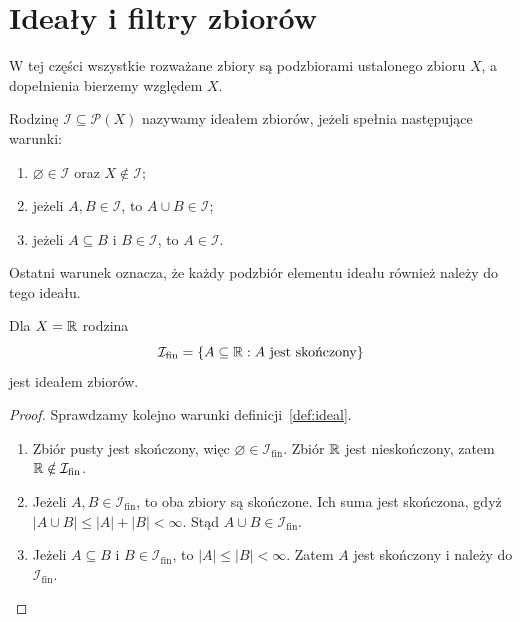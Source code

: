 \section{Ideały i filtry zbiorów}
\label{sec:idealy-filtry}

W tej części wszystkie rozważane zbiory są podzbiorami ustalonego zbioru
$X$, a dopełnienia bierzemy względem $X$.

\begin{definicja}
\label{def:ideal}
Rodzinę $\mathcal{I}\subseteq\mathcal{P}(X)$ nazywamy ideałem zbiorów,
jeżeli spełnia następujące warunki:
\begin{enumerate}
  \item $\varnothing\in\mathcal{I}$ oraz $X\notin\mathcal{I}$;
  \item jeżeli $A,B\in\mathcal{I}$, to $A\cup B\in\mathcal{I}$;
  \item jeżeli $A\subseteq B$ i $B\in\mathcal{I}$, to $A\in\mathcal{I}$.
\end{enumerate}
Ostatni warunek oznacza, że każdy podzbiór elementu ideału również
należy do tego ideału.
\end{definicja}

\begin{przyklad}
\label{prz:ideal-skonczone}
Dla $X=\mathbb{R}$ rodzina
\begin{equation}
  \mathcal{I}_{\mathrm{fin}}
  =\{A\subseteq\mathbb{R}:A\text{ jest skończony}\}
  \label{eq:ideal-skonczone}
\end{equation}
jest ideałem zbiorów.
\end{przyklad}

\begin{proof}
Sprawdzamy kolejno warunki definicji~\ref{def:ideal}.
\begin{enumerate}
  \item Zbiór pusty jest skończony, więc
  $\varnothing\in\mathcal{I}_{\mathrm{fin}}$.
  Zbiór $\mathbb{R}$ jest nieskończony, zatem $\mathbb{R}\notin\mathcal{I}_{\mathrm{fin}}$.
  \item Jeżeli $A,B\in\mathcal{I}_{\mathrm{fin}}$, to oba zbiory są
  skończone. Ich suma jest skończona, gdyż
  $|A\cup B|\leq|A|+|B|<\infty$.
  Stąd $A\cup B\in\mathcal{I}_{\mathrm{fin}}$.
  \item Jeżeli $A\subseteq B$ i $B\in\mathcal{I}_{\mathrm{fin}}$,
  to $|A|\leq|B|<\infty$. Zatem $A$ jest skończony i należy
  do $\mathcal{I}_{\mathrm{fin}}$.
\end{enumerate}
\end{proof}

